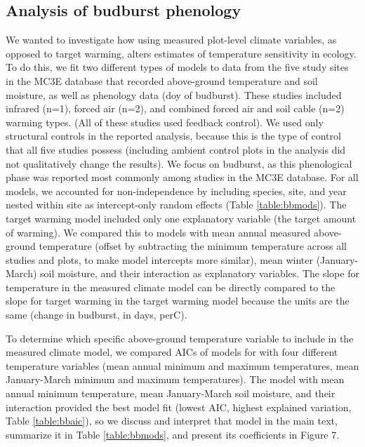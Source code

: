 \documentclass{article}
\begin{document}
\subsection* {Analysis of budburst phenology}
We wanted to investigate how using measured plot-level climate variables, as opposed to target warming, alters estimates of temperature sensitivity in ecology. To do this, we fit two different types of models to data from the five study sites in the MC3E database that recorded above-ground temperature and soil moisture, as well as phenology data (doy of budburst). These studies included infrared (n=1), forced air (n=2), and combined forced air and soil cable (n=2) warming types. (All of these studies used feedback control). We used only structural controls in the reported analysis, because this is the type of control that all five studies possess (including ambient control plots in the analysis did not qualitatively change the results). We focus on budburst, as this phenological phase was reported most commonly among studies in the MC3E database. For all models, we accounted for non-independence by including species, site, and year nested within site as intercept-only random effects (Table \ref{table:bbmods}). The target warming model included only one explanatory variable (the target amount of warming).  We compared this to models with mean annual measured above-ground temperature (offset by subtracting the minimum temperature across all studies and plots, to make model intercepts more similar), mean winter (January-March) soil moisture, and their interaction as explanatory variables. The slope for temperature in the measured climate model can be directly compared to the slope for target warming in the target warming model because the units are the same (change in budburst, in days, per\degree C).
\par To determine which specific above-ground temperature variable to include in the measured climate model, we compared AICs of models for with four different temperature variables (mean annual minimum and maximum temperatures, mean January-March minimum and maximum temperatures). The model with mean annual minimum temperature, mean January-March soil moisture, and their interaction provided the best model fit (lowest AIC, highest explained variation, Table \ref{table:bbaic}), so we discuss and interpret that model in the main text, summarize it in Table \ref{table:bbmods}, and present its coefficients in Figure 7. 


\clearpage
\end{document}
